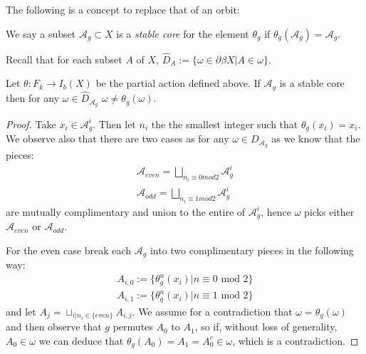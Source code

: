 \begin{conjecture}
The following is a concept to replace that of an orbit:
\begin{definition}
We say a subset $\mathcal{A}_{g} \subset X$ is a \textit{stable core} for the element $\theta_{g}$ if $\theta_{g}(\mathcal{A}_{g})=\mathcal{A}_{g}$. 
\end{definition}
Recall that for each subset $A$ of $X$, $\widehat{D}_{A}:=\lbrace \omega \in \partial \beta X | A \in \omega \rbrace$.

\begin{lemma}\label{Lem:StabCore}
Let $\theta: F_{k} \rightarrow I_{b}(X)$ be the partial action defined above. If $\mathcal{A}_{g}$ is a stable core then for any $\omega \in \widehat{D}_{\mathcal{A}_{g}}$ $\omega \not = \theta_{g}(\omega)$.
\end{lemma}
\begin{proof}
Take $x_{i}\in \mathcal{A}^{i}_{g}$. Then let $n_{i}$ the the smallest integer such that $\theta_{g}(x_{i})=x_{i}$. We observe also that there are two cases as for any $\omega \in D_{\mathcal{A}_{g}}$ as we know that the pieces: 
\begin{eqnarray*}
\mathcal{A}_{even}=\bigsqcup_{n_{i}\equiv 0 mod 2} \mathcal{A}_{g}^{i}\\
\mathcal{A}_{odd}=\bigsqcup_{n_{i} \equiv 1 mod 2} \mathcal{A}_{g}^{i}
\end{eqnarray*}
are mutually complimentary and union to the entire of $\mathcal{A}_{g}^{i}$, hence $\omega$ picks either $\mathcal{A}_{even}$ or $\mathcal{A}_{odd}$.

For the even case break each $\mathcal{A}_{g}$ into two complimentary pieces in the following way:
\begin{eqnarray*}
A_{i,0}:= \lbrace \theta_{g}^{n}(x_{i}) |n \equiv 0 \mbox{ mod } 2 \rbrace \\
A_{i,1}:= \lbrace \theta_{g}^{n}(x_{i}) |n \equiv 1 \mbox{ mod } 2 \rbrace
\end{eqnarray*}
and let $A_{j}=\sqcup_{i|n_{i} \in \lbrace even \rbrace}A_{i,j}$. We assume for a contradiction that $\omega=\theta_{g}(\omega)$ and then observe that $g$ permutes $A_{0}$ to $A_{1}$, so if, without loss of generality, $A_{0} \in \omega$ we can deduce that $\theta_{g}(A_{0})=A_{1}=A_{0}^{c}\in \omega$, which is a contradiction. 


\end{proof}
\end{conjecture}
